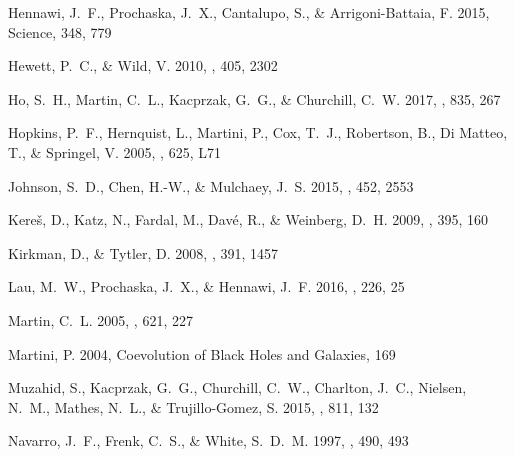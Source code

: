 \documentclass[iop]{emulateapj}
\begin{document}
\begin{thebibliography}{46}
{Hennawi}, J.~F., {Prochaska}, J.~X., {Cantalupo}, S., \& {Arrigoni-Battaia},
  F. 2015, Science, 348, 779

{Hewett}, P.~C., \& {Wild}, V. 2010, \mnras, 405, 2302

{Ho}, S.~H., {Martin}, C.~L., {Kacprzak}, G.~G., \& {Churchill}, C.~W. 2017,
  \apj, 835, 267

{Hopkins}, P.~F., {Hernquist}, L., {Martini}, P., {Cox}, T.~J., {Robertson},
  B., {Di Matteo}, T., \& {Springel}, V. 2005, \apjl, 625, L71

{Johnson}, S.~D., {Chen}, H.-W., \& {Mulchaey}, J.~S. 2015, \mnras, 452, 2553

{Kere\v{s}}, D., {Katz}, N., {Fardal}, M., {Dav{\'e}}, R., \& {Weinberg}, D.~H.
  2009, \mnras, 395, 160

{Kirkman}, D., \& {Tytler}, D. 2008, \mnras, 391, 1457

{Lau}, M.~W., {Prochaska}, J.~X., \& {Hennawi}, J.~F. 2016, \apjs, 226, 25

{Martin}, C.~L. 2005, \apj, 621, 227

{Martini}, P. 2004, Coevolution of Black Holes and Galaxies, 169

{Muzahid}, S., {Kacprzak}, G.~G., {Churchill}, C.~W., {Charlton}, J.~C.,
  {Nielsen}, N.~M., {Mathes}, N.~L., \& {Trujillo-Gomez}, S. 2015, \apj, 811,
  132

{Navarro}, J.~F., {Frenk}, C.~S., \& {White}, S.~D.~M. 1997, \apj, 490, 493


\end{thebibliography}
\end{document}
